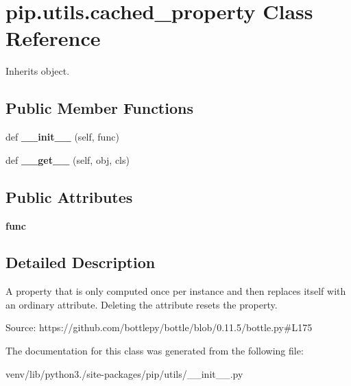 \hypertarget{classpip_1_1utils_1_1cached__property}{}\section{pip.\+utils.\+cached\+\_\+property Class Reference}
\label{classpip_1_1utils_1_1cached__property}


Inherits object.

\subsection*{Public Member Functions}
\begin{DoxyCompactItemize}
\item 
\mbox{\label{classpip_1_1utils_1_1cached__property_a6ef215955b246229a5b64b22e89dd333}} 
def {\bfseries \+\_\+\+\_\+init\+\_\+\+\_\+} (self, func)
\item 
\mbox{\label{classpip_1_1utils_1_1cached__property_a3965860d6faf79ec3aadff8461c6b685}} 
def {\bfseries \+\_\+\+\_\+get\+\_\+\+\_\+} (self, obj, cls)
\end{DoxyCompactItemize}
\subsection*{Public Attributes}
\begin{DoxyCompactItemize}
\item 
\mbox{\label{classpip_1_1utils_1_1cached__property_aefdda2e126740633a894cb171f13f832}} 
{\bfseries func}
\end{DoxyCompactItemize}


\subsection{Detailed Description}
\begin{DoxyVerb}A property that is only computed once per instance and then replaces
   itself with an ordinary attribute. Deleting the attribute resets the
   property.

   Source: https://github.com/bottlepy/bottle/blob/0.11.5/bottle.py#L175
\end{DoxyVerb}
 

The documentation for this class was generated from the following file\+:\begin{DoxyCompactItemize}
\item 
venv/lib/python3./site-\/packages/pip/utils/\+\_\+\+\_\+init\+\_\+\+\_\+.\+py\end{DoxyCompactItemize}
